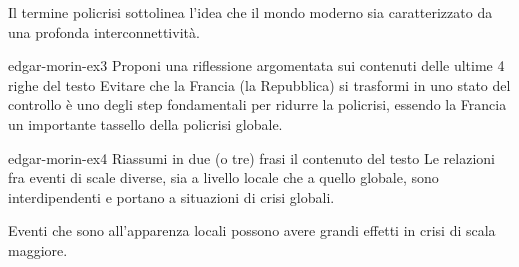 \documentclass[preview]{standalone}
\begin{document}
\begin{plainhtml}
    Il termine policrisi sottolinea l'idea che il mondo moderno sia
    caratterizzato da una profonda interconnettività.
\end{plainhtml}

\begin{snippetexercise}{edgar-morin-ex3}
{Proponi una riflessione argomentata sui contenuti delle ultime 4 righe del testo}
    Evitare che la Francia (la Repubblica) si trasformi in uno stato del controllo
    è uno degli step fondamentali per ridurre la policrisi,
    essendo la Francia un importante tassello della policrisi globale.
\end{snippetexercise}

\begin{snippetexercise}{edgar-morin-ex4}
{Riassumi in due (o tre) frasi il contenuto del testo}
    Le relazioni fra eventi di scale diverse, sia a livello locale che a quello globale, 
    sono interdipendenti e portano a situazioni di crisi globali.

    Eventi che sono all'apparenza locali possono avere grandi effetti in crisi di scala maggiore.
\end{snippetexercise}
\end{document}
